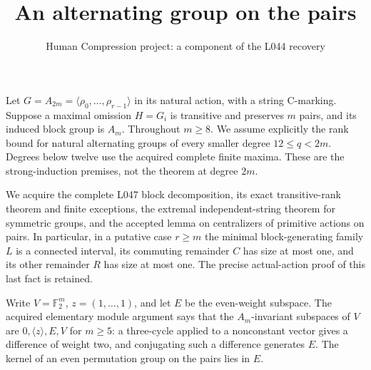 \documentclass[11pt,a4paper]{article}
\title{An alternating group on the pairs}
\author{Human Compression project: a component of the L044 recovery}
\date{}
\newcommand{\gen}[1]{\langle#1\rangle}
\begin{document}
\maketitle
Let $G=A_{2m}=\gen{\rho_0,\ldots,\rho_{r-1}}$ in its
natural action, with a string C-marking. Suppose a maximal
omission $H=G_i$ is transitive and preserves $m$ pairs, and
its induced block group is $A_m$. Throughout $m\ge8$.
We assume explicitly the rank bound for natural alternating
groups of every smaller degree $12\le q<2m$. Degrees below
twelve use the acquired complete finite maxima. These are the
strong-induction premises, not the theorem at degree $2m$.

We acquire the complete L047 block decomposition, its exact
transitive-rank theorem and finite exceptions, the extremal
independent-string theorem for symmetric groups, and the
accepted lemma on centralizers of primitive actions on pairs.
In particular, in a putative case $r\ge m$ the minimal
block-generating family $L$ is a connected interval, its
commuting remainder $C$ has size at most one, and its other
remainder $R$ has size at most one. The precise actual-action
proof of this last fact is retained.

Write $V=\mathbb F_2^m$, $z=(1,\ldots,1)$, and let $E$
be the even-weight subspace. The acquired elementary module
argument says that the $A_m$-invariant subspaces of $V$ are
$0,\gen z,E,V$ for $m\ge5$: a three-cycle applied to a
nonconstant vector gives a difference of weight two, and
conjugating such a difference generates $E$. The kernel of
an even permutation group on the pairs lies in $E$.
\end{document}
